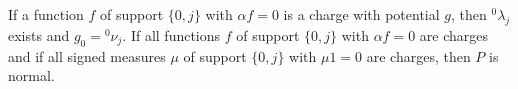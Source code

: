 If a function $f$ of support $\{0,j\}$ with $\alpha f = 0$ is a charge with potential $g$, then ${}^0\lambda_j$ exists and $g_0 = {}^0\nu_j$. If all functions $f$ of support $\{0, j\}$ with $\alpha f = 0$ are charges and if all signed measures $\mu$ of support $\{0, j\}$ with $\mu 1 = 0$ are charges, then $P$ is normal.

